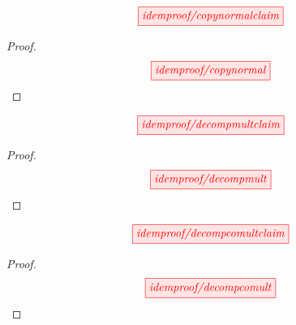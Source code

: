 \newpage
\vspace*{\fill}
\begin{lemma}\label{lem:ecopynormal}
\[\scalebox{1}{\tikzfig{idemproof/copynormalclaim}}\]
\begin{proof}
\[\scalebox{1}{\tikzfig{idemproof/copynormal}}\]
\end{proof}
\end{lemma}
\vspace*{\fill}

\newpage
\vspace*{\fill}
\begin{proposition}\label{prop:decompmult}
\[\scalebox{1}{\tikzfig{idemproof/decompmultclaim}}\]
\begin{proof}
\[\scalebox{1}{\tikzfig{idemproof/decompmult}}\]
\end{proof}
\end{proposition}
\vspace*{\fill}

\newpage
\vspace*{\fill}
\begin{proposition}\label{prop:decompcomult}
\[\scalebox{1}{\tikzfig{idemproof/decompcomultclaim}}\]
\begin{proof}
\[\scalebox{1}{\tikzfig{idemproof/decompcomult}}\]
\end{proof}
\end{proposition}
\vspace*{\fill}

